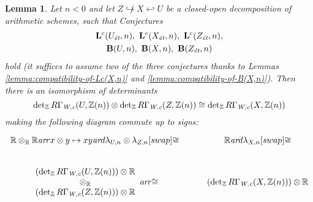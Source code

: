 \documentclass[10pt,a4paper,oneside,draft]{article}
\newcommand{\RR}{\mathbb{R}}
\newcommand{\ZZ}{\mathbb{Z}}
\renewcommand{\det}{\operatorname{det}}
\newcommand{\ar}{\text{\it ar}}
\newcommand{\et}{\text{\it \'{e}t}}
\newcommand{\Wc}{\text{\it W,c}}
\theoremstyle{myplain}
\newtheorem{lemma}[theorem]{Lemma}
\theoremstyle{mydefinition}
\numberwithin{equation}{section}
\begin{document}
\begin{lemma}
  \label{lemma:lambda-and-closed-open-decompositions}
  Let $n < 0$ and let $Z \not\hookrightarrow X \hookleftarrow U$ be a
  closed-open decomposition of arithmetic schemes, such that Conjectures
  \begin{gather*}
    \mathbf{L}^c (U_\et,n), ~ \mathbf{L}^c (X_\et,n), ~ \mathbf{L}^c (Z_\et,n),\\
    \mathbf{B} (U,n), ~ \mathbf{B} (X,n), ~ \mathbf{B} (Z_\et,n)
  \end{gather*}
  hold (it suffices to assume two of the three conjectures thanks to Lemmas
  \ref{lemma:compatibility-of-Lc(X,n)} and \ref{lemma:compatibility-of-B(X,n)}).
  Then there is an isomorphism of determinants
  \begin{equation}
    \label{eqn:isomorphism-of-det-RGamma-Wc-for-closed-open-decompositions}
    \det_\ZZ R\Gamma_\Wc (U, \ZZ(n)) \otimes
    \det_\ZZ R\Gamma_\Wc (Z, \ZZ(n)) \cong
    \det_\ZZ R\Gamma_\Wc (X, \ZZ(n))
  \end{equation}
  making the following diagram commute up to signs:
  \begin{equation}
    \label{eqn:lambda-and-closed-open-decompositions}
    \begin{tikzcd}
      \RR \otimes_\RR \RR \ar{r}{x\otimes y \mapsto xy}\ar{d}{\lambda_{U,n} \otimes \lambda_{Z,n}}[swap]{\cong} & \RR\ar{d}{\lambda_{X,n}}[swap]{\cong} \\
      \begin{array}{c} (\det_\ZZ R\Gamma_\Wc (U, \ZZ(n)))\otimes \RR \\ \otimes_\RR \\ (\det_\ZZ R\Gamma_\Wc (Z, \ZZ(n)))\otimes \RR \end{array} \ar{r}{\cong} & (\det_\ZZ R\Gamma_\Wc (X, \ZZ(n))) \otimes \RR
    \end{tikzcd}
  \end{equation}


\end{lemma}
\end{document}
